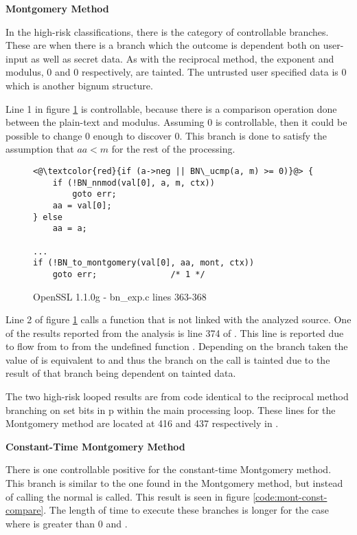 \noindent
\textbf{Montgomery Method}

   In the high-risk classifications, there is the category of controllable
   branches. These are when there is a branch which the outcome is dependent
   both on user-input as well as secret data. As with the reciprocal method, the
   exponent and modulus,  0 and  0 respectively, are tainted. The
   untrusted user specified data is  0 which is another bignum structure.

   Line 1 in figure \ref{code:mont-nonconst-compare} is controllable, because
   there is a comparison operation done between the plain-text and modulus.
   Assuming  0 is controllable, then it could be possible to change
    0 enough to discover  0. This branch is done to
   satisfy the assumption that $aa < m$ for the rest of the processing.


\begin{figure}[h!]
\begin{lstlisting}
<@\textcolor{red}{if (a->neg || BN\_ucmp(a, m) >= 0)}@> {
    if (!BN_nnmod(val[0], a, m, ctx))
        goto err;
    aa = val[0];
} else
    aa = a;

...
if (!BN_to_montgomery(val[0], aa, mont, ctx))
    goto err;               /* 1 */
\end{lstlisting}
\caption{OpenSSL 1.1.0g - bn\_exp.c lines 363-368}
\label{code:mont-nonconst-compare}
\end{figure}

Line 2 of figure \ref{code:mont-nonconst-compare} calls a function that is not
linked with the analyzed source. One of the results reported from the analysis
is line 374 of . This line is reported due to flow from
 to  from the undefined function .
Depending on the branch taken the value of  is equivalent to
 and thus the branch on the  call is
tainted due to the result of that branch being dependent on tainted data.

The two high-risk looped results are from code identical to the reciprocal
method branching on set bits in p within the main processing loop. These lines
for the Montgomery method are located at 416 and 437 respectively in
.

\noindent
\textbf{Constant-Time Montgomery Method}

There is one controllable positive for the constant-time Montgomery method. This
branch is similar to the one found in the Montgomery method, but instead of
calling  the normal  is called. This result is
seen in figure \ref{code:mont-const-compare}. The length of time to execute these
branches is longer for the case where  is greater than 0 and
.

